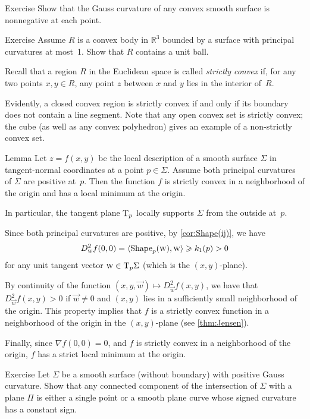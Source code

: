 \begin{thm}{Exercise}\label{ex:convex-surf}
Show that the Gauss curvature of any convex smooth surface is nonnegative at each point.
\end{thm}

\begin{thm}{Exercise}\label{ex:convex-lagunov}
Assume $R$ is a convex body in $\mathbb{R}^3$ bounded by a surface with principal curvatures at most~1.
Show that $R$ contains a unit ball.
\end{thm}

Recall that a region $R$ in the Euclidean space is called  {}\emph{strictly convex} if, for any two points $x,y\in R$, any point $z$ between $x$ and $y$ lies in the interior of~$R$.

Evidently, a closed convex region is strictly convex if and only if its boundary does not contain a line segment.
Note that any open convex set is strictly convex;
the cube (as well as any convex polyhedron) gives an example of a non-strictly convex set.


\begin{thm}{Lemma}\label{lem:gauss+=>convexity}
Let $z=f(x,y)$ be the local description of a smooth surface $\Sigma$ in tangent-normal coordinates at a point $p\in\Sigma$.
Assume both principal curvatures of $\Sigma$ are positive at~$p$.
Then the function $f$ is strictly convex in a neighborhood of the origin and has a local minimum at the origin.

In particular, the tangent plane $\mathrm{T}_p$ locally supports $\Sigma$ from the outside at~$p$.
\end{thm}

Since both principal curvatures are positive, by \ref{cor:Shape(ij)}, we have 
\[D^2_{\text{\sc{w}}}f(0,0)=\langle \mathop{\rm Shape}\nolimits_p({\text{\sc{w}}}),{\text{\sc{w}}}\rangle\geqslant k_1(p)>0\] 
for any unit tangent vector ${\text{\sc{w}}}\in\mathrm{T}_p\Sigma$ (which is the $(x,y)$-plane).

By continuity of the function $(x,y,{\vec w})\mapsto D^2_{\vec w}f(x,y)$,
we have that $D^2_{\vec w}f(x,y)>0$ if $\vec w\ne 0$ and $(x,y)$ lies in a sufficiently small neighborhood of the origin.
This property implies that $f$ is a strictly convex function in a neighborhood of the origin in the $(x,y)$-plane (see \ref{thm:Jensen}).

Finally, since $\nabla f(0,0)=0$, and $f$ is strictly convex in a neighborhood of the origin, $f$ has a strict local minimum at the origin.
\qeds

\begin{thm}{Exercise}\label{ex:section-of-convex}
Let $\Sigma$ be a smooth surface (without boundary) with positive Gauss curvature.
Show that any connected component of the intersection of $\Sigma$ with a plane $\Pi$ is either a single point or a smooth plane curve whose signed curvature has a constant sign.
\end{thm}

